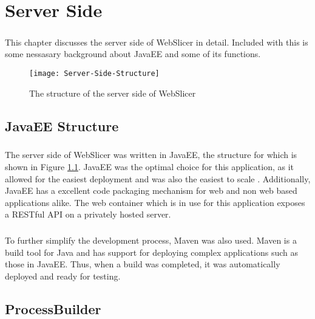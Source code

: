 \chapter{Server Side}
\paragraph{}
This chapter discusses the server side of WebSlicer in detail. 
Included with this is some nessasary background about JavaEE and some of its functions.

\begin{figure}[!ht]
  \centering
  \texttt{[image: Server-Side-Structure]}
  \caption{The structure of the server side of WebSlicer}
  \label{fig:server-side-structure}
\end{figure}

\section{JavaEE Structure}
\paragraph{}
The server side of WebSlicer was written in JavaEE, the structure for which is shown in Figure \ref{fig:server-side-structure}.
JavaEE was the optimal choice for this application, as it allowed for the easiest deployment and was also the easiest to scale \citep{pilgrim-2013}.
Additionally, JavaEE has a excellent code packaging mechanism for web and non web based applications alike.
The web container which is in use for this application exposes a RESTful API on a privately hosted server.

\paragraph{}
To further simplify the development process, Maven was also used.
Maven is a build tool for Java and has support for deploying complex applications such as those in JavaEE.
Thus, when a build was completed, it was automatically deployed and ready for testing.

\section{ProcessBuilder}
